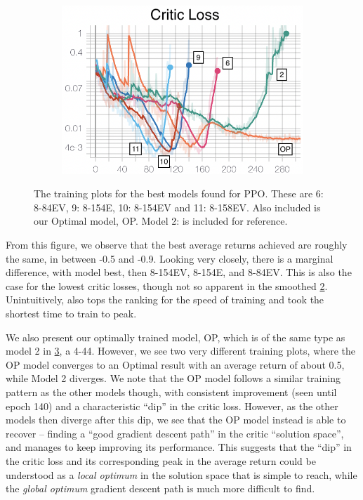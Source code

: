 \begin{figure}[hbt]
\begin{subfigure}[b]{0.32\textwidth}
         \caption{}
         \label{fig:5_training_ppo_bestModelsActorL}
     \end{subfigure}
     \hfill
     \begin{subfigure}[b]{0.32\textwidth}
         \centering
         \includegraphics[width=\textwidth]{figures/5_/Training/ppo_bestmodelsCriticL.png}
         \caption{}
         \label{fig:5_training_ppo_bestModelsCriticL}
     \end{subfigure}
    \captionsetup{justification=centering}
    \caption{The training plots for the best models found for PPO. These are 6: 8-84EV, 9: 8-154E, 10: 8-154EV and 11: 8-158EV. Also included is our Optimal model, OP. Model 2: \two is included for reference.}
     \label{fig:5_training_ppo_bestModels}
\end{figure}
From this figure, we observe that the best average returns achieved are roughly the same, in between -0.5 and -0.9.
Looking very closely, there is a marginal difference, with model \eleven best, then 8-154EV, 8-154E, and
8-84EV. This is also the case for the lowest critic losses, though not so apparent in the smoothed \cref{fig:5_training_ppo_bestModelsCriticL}.
Unintuitively, \eleven also tops the ranking for the speed of training and took the shortest time to train to peak. 

We also present our optimally trained model, OP, which is of the same type as model 2 in \cref{fig:5_training_ppo_bestModels}, a 4-44. However, we see two very different training plots, where the OP model converges to an Optimal result with an average return of about 0.5, while Model 2 diverges.
We note that the OP model follows a similar training pattern as the other models though, with consistent improvement (seen until epoch 140) and a characteristic ``dip'' in the critic loss. However, as the other models then diverge after this dip, we see that the OP model instead is able to recover -- finding a ``good gradient descent path'' in the critic ``solution space'', and manages to keep improving its performance. This suggests that the ``dip'' in the critic loss and its corresponding peak in the average return could be understood as a \textit{local optimum} in the solution space that is simple to reach, while the \textit{global optimum} gradient descent path is much more difficult to find.

